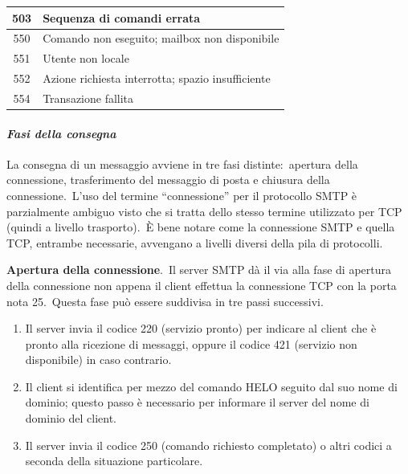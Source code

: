 \begin{table}[H]
\begin{tabular}{|c|p{11cm}|}
        \hline
        503           & Sequenza di comandi errata                                      \\
        \hline
        550           & Comando non eseguito; mailbox non disponibile                   \\
        \hline
        551           & Utente non locale                                               \\
        \hline
        552           & Azione richiesta interrotta; spazio insufficiente               \\
        \hline
        554           & Transazione fallita                                             \\
        \hline
    \end{tabular}
\end{table}

\paragraph{\emph{Fasi della consegna}}

La consegna di un messaggio avviene in tre fasi distinte:\ apertura della connessione, trasferimento del messaggio di posta e chiusura della connessione.\
L'uso del termine ``connessione'' per il protocollo SMTP è parzialmente ambiguo visto che si tratta dello stesso termine utilizzato per TCP (quindi a livello trasporto).\
È bene notare come la connessione SMTP e quella TCP, entrambe necessarie, avvengano a livelli diversi della pila di protocolli.

\textbf{Apertura della connessione}.\
Il server SMTP dà il via alla fase di apertura della connessione non appena il client effettua la connessione TCP con la porta nota 25.\
Questa fase può essere suddivisa in tre passi successivi.

\begin{enumerate}
    \item Il server invia il codice 220 (servizio pronto) per indicare al client che è pronto alla ricezione di messaggi, oppure il codice 421 (servizio non disponibile) in caso contrario.
    \item Il client si identifica per mezzo del comando HELO seguito dal suo nome di dominio; questo passo è necessario per informare il server del nome di dominio del client.
    \item Il server invia il codice 250 (comando richiesto completato) o altri codici a seconda della situazione particolare.
\end{enumerate}

